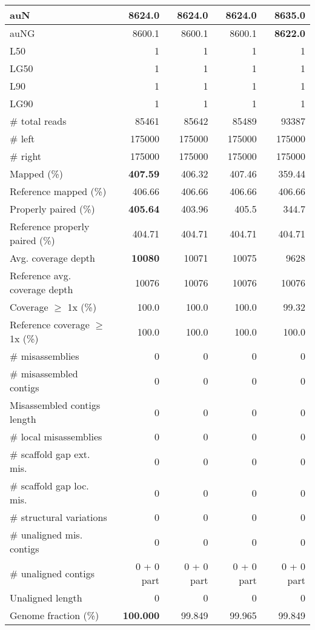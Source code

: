 \documentclass[12pt,a4paper]{article}
\begin{document}
\begin{table}[ht]
\begin{center}
\begin{tabular}{|l*{4}{|r}|}
auN & 8624.0 & 8624.0 & 8624.0 & {\bf 8635.0} \\ \hline
auNG & 8600.1 & 8600.1 & 8600.1 & {\bf 8622.0} \\ \hline
L50 & 1 & 1 & 1 & 1 \\ \hline
LG50 & 1 & 1 & 1 & 1 \\ \hline
L90 & 1 & 1 & 1 & 1 \\ \hline
LG90 & 1 & 1 & 1 & 1 \\ \hline
\# total reads & 85461 & 85642 & 85489 & 93387 \\ \hline
\# left & 175000 & 175000 & 175000 & 175000 \\ \hline
\# right & 175000 & 175000 & 175000 & 175000 \\ \hline
Mapped (\%) & {\bf 407.59} & 406.32 & 407.46 & 359.44 \\ \hline
Reference mapped (\%) & 406.66 & 406.66 & 406.66 & 406.66 \\ \hline
Properly paired (\%) & {\bf 405.64} & 403.96 & 405.5 & 344.7 \\ \hline
Reference properly paired (\%) & 404.71 & 404.71 & 404.71 & 404.71 \\ \hline
Avg. coverage depth & {\bf 10080} & 10071 & 10075 & 9628 \\ \hline
Reference avg. coverage depth & 10076 & 10076 & 10076 & 10076 \\ \hline
Coverage $\geq$ 1x (\%) & 100.0 & 100.0 & 100.0 & 99.32 \\ \hline
Reference coverage $\geq$ 1x (\%) & 100.0 & 100.0 & 100.0 & 100.0 \\ \hline
\# misassemblies & 0 & 0 & 0 & 0 \\ \hline
\# misassembled contigs & 0 & 0 & 0 & 0 \\ \hline
Misassembled contigs length & 0 & 0 & 0 & 0 \\ \hline
\# local misassemblies & 0 & 0 & 0 & 0 \\ \hline
\# scaffold gap ext. mis. & 0 & 0 & 0 & 0 \\ \hline
\# scaffold gap loc. mis. & 0 & 0 & 0 & 0 \\ \hline
\# structural variations & 0 & 0 & 0 & 0 \\ \hline
\# unaligned mis. contigs & 0 & 0 & 0 & 0 \\ \hline
\# unaligned contigs & 0 + 0 part & 0 + 0 part & 0 + 0 part & 0 + 0 part \\ \hline
Unaligned length & 0 & 0 & 0 & 0 \\ \hline
Genome fraction (\%) & {\bf 100.000} & 99.849 & 99.965 & 99.849 \\ \hline

\end{tabular}
\end{center}
\end{table}
\end{document}
